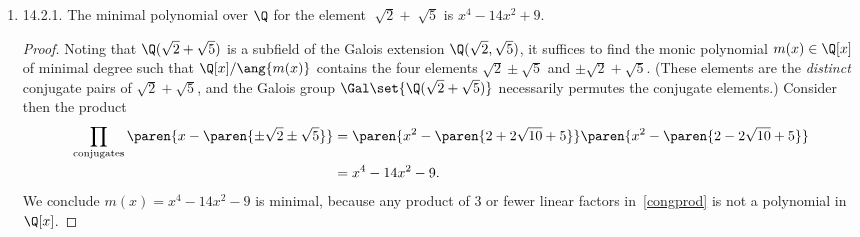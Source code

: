 \documentclass[onesided]{ccg-pset}
\author{Colton Grainger}
\date{\today}
\begin{document}
\maketitle

\begin{enumerate}

\item \label{14.2.1} 14.2.1.
The minimal polynomial over $\Q$ for the element $\sqrt[]{ 2 } + \sqrt[]{ 5 }$ is $x^4 - 14x^2 +9$.

\begin{proof}
    Noting that $\Q(\sqrt{ 2 } + \sqrt{ 5 })$ is a subfield of the Galois extension $\Q(\sqrt{ 2 } , \sqrt{ 5 })$, it suffices to find the monic polynomial $m(x) \in \Q[x]$ of minimal degree such that $\Q[x]/\ang{m(x)}$ contains the four elements $\sqrt{ 2 } \pm \sqrt{ 5 }$ and $\pm \sqrt{ 2 } + \sqrt{ 5 }$. (These elements are the \emph{distinct} conjugate pairs of $\sqrt{ 2 } + \sqrt{ 5 }$, and the Galois group $\Gal\set{\Q(\sqrt{ 2 } + \sqrt{ 5 })}$ necessarily permutes the conjugate elements.) Consider then the product
    \begin{align}
        \prod\limits_{\text{conjugates}}\paren{x - \paren{\pm\sqrt{ 2 } \pm \sqrt{ 5 }}} 
        \label{congprod}
            & = \paren{ x^2 -\paren{ 2 + 2\sqrt{ 10 }+5  }  } \paren{ x^2 - \paren{ 2 - 2\sqrt{ 10 } + 5 }  } \\
            & = x^4 - 14x^2 -9.
    \end{align}
    We conclude $m(x) = x^4 - 14x^2 -9$ is minimal, because any product of $3$ or fewer linear factors in~\eqref{congprod} is not a polynomial in $\Q[x]$.
\end{proof}


\end{enumerate}
\end{document}
